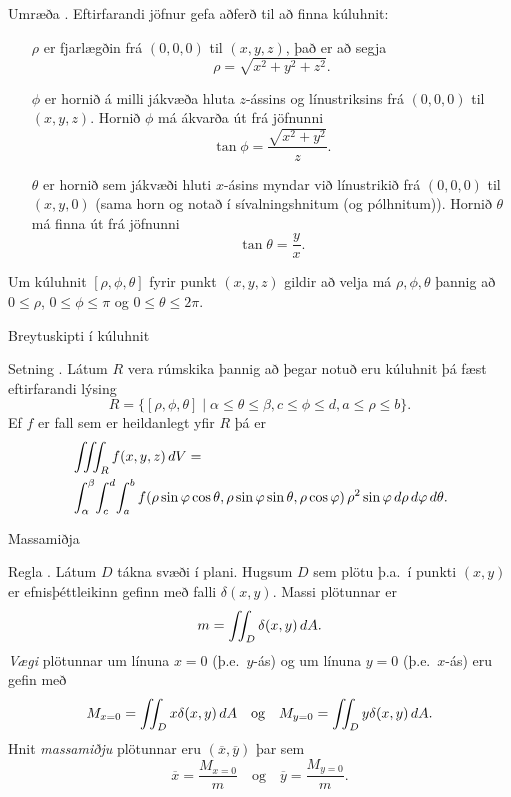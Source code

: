 \begin{frame}{} 

\begin {block}{Umræða \kaflanr.}
Eftirfarandi jöfnur gefa aðferð til að finna kúluhnit:
\begin{itemize}
\item[$\rho$]  er fjarlægðin frá $(0,0,0)$ til $(x,y,z)$, það er að segja 
$$\rho=\sqrt{x^2+y^2+z^2}.$$
\item[$\phi$] er hornið á milli jákvæða hluta $z$-ássins og línustriksins frá $(0,0,0)$ til $(x,y,z)$.  Hornið $\phi$ má ákvarða út frá jöfnunni
$$\tan\phi=\frac{\sqrt{x^2+y^2}}{z}.$$
\item[$\theta$] er hornið sem jákvæði hluti $x$-ásins myndar við línustrikið frá $(0,0,0)$ til $(x,y,0)$ (sama horn og notað í sívalningshnitum (og pólhnitum)).   Hornið $\theta$ má finna út frá jöfnunni
$$\tan\theta=\frac{y}{x}.$$
\end{itemize}
Um kúluhnit $[\rho, \phi, \theta]$ fyrir punkt $(x,y,z)$ gildir að 
velja má $\rho, \phi, \theta$ þannig að
$0\leq \rho$, $0\leq\phi\leq \pi$ og $0\leq\theta\leq 2\pi$.
\end{block}

\end{frame}


\begin{frame}{Breytuskipti í kúluhnit} 

\begin {block}{Setning \kaflanr.}
 Látum $R$ vera rúmskika þannig að þegar notuð eru kúluhnit þá fæst eftirfarandi lýsing
$$R=\{[\rho,\phi,\theta]\mid \alpha\leq\theta\leq\beta, 
c\leq\phi\leq d, a\leq \rho\leq b\}.$$ 
Ef $f$ er fall sem er heildanlegt yfir $R$ þá er
\begin{align*}&\thrint_R f(x,y,z)\,dV=\\ &\int_\alpha^\beta\!\int_c^d\!\int_a^b f(\rho\sin\phi\cos\theta, \rho\sin\phi\sin\theta,\rho\cos\phi)
\,\rho^2\sin\phi\,d\rho\,d\phi\,d\theta.
\end{align*}
\end{block}

\end{frame}


\begin{frame}{Massamiðja} 

\begin {block}{Regla \kaflanr.}
 Látum $D$ tákna svæði í plani.  Hugsum $D$ sem plötu þ.a.~í punkti $(x,y)$ er efnisþéttleikinn gefinn með falli $\delta(x,y)$.  Massi plötunnar er 
$$m=\int\!\!\!\int_D \delta(x,y)\,dA.$$
 {\em Vægi} plötunnar um línuna $x=0$ (þ.e.~$y$-ás) og um línuna $y=0$ (þ.e.~$x$-ás) eru gefin með
 $$M_{x=0}=\int\!\!\!\int_D x\delta(x,y)\,dA \quad \text{og} \quad M_{y=0}=\int\!\!\!\int_D y\delta(x,y)\,dA.$$
Hnit {\em massamiðju} plötunnar eru $(\overline{x}, \overline{y})$ þar sem 
$$\overline{x}=\frac{M_{x=0}}{m}
 \quad \text{og}\quad \overline{y}=\frac{M_{y=0}}{m}.$$

\end{block}

\end{frame}



